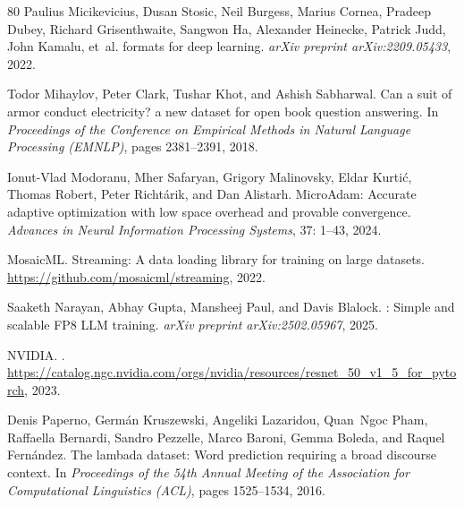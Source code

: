 \documentclass[10pt,twocolumn,letterpaper]{article}
\theoremstyle{plain}
\theoremstyle{definition}
\theoremstyle{remark}
\begin{document}
{\begin{thebibliography}{80}
Paulius Micikevicius, Dusan Stosic, Neil Burgess, Marius Cornea, Pradeep Dubey,
  Richard Grisenthwaite, Sangwon Ha, Alexander Heinecke, Patrick Judd, John
  Kamalu, et~al.
 formats for deep learning.
\newblock \emph{arXiv preprint arXiv:2209.05433}, 2022.

Todor Mihaylov, Peter Clark, Tushar Khot, and Ashish Sabharwal.
\newblock Can a suit of armor conduct electricity? a new dataset for open book
  question answering.
\newblock In \emph{Proceedings of the Conference on Empirical Methods in
  Natural Language Processing (EMNLP)}, pages 2381--2391, 2018.

Ionut-Vlad Modoranu, Mher Safaryan, Grigory Malinovsky, Eldar Kurti{\'c},
  Thomas Robert, Peter Richt{\'a}rik, and Dan Alistarh.
\newblock Micro{A}dam: Accurate adaptive optimization with low space overhead
  and provable convergence.
\newblock \emph{Advances in Neural Information Processing Systems},
  37: 1--43, 2024.

{MosaicML}.
\newblock Streaming: A data loading library for training on large datasets.
\newblock \url{https://github.com/mosaicml/streaming}, 2022.

Saaketh Narayan, Abhay Gupta, Mansheej Paul, and Davis Blalock.
: Simple and scalable {FP8} {LLM} training.
\newblock \emph{arXiv preprint arXiv:2502.05967}, 2025.

{NVIDIA}.
.
\newblock
  \url{https://catalog.ngc.nvidia.com/orgs/nvidia/resources/resnet_50_v1_5_for_pytorch},
  2023.

Denis Paperno, Germ{\'a}n Kruszewski, Angeliki Lazaridou, Quan~Ngoc Pham,
  Raffaella Bernardi, Sandro Pezzelle, Marco Baroni, Gemma Boleda, and Raquel
  Fern{\'a}ndez.
\newblock The lambada dataset: Word prediction requiring a broad discourse
  context.
\newblock In \emph{Proceedings of the 54th Annual Meeting of the Association
  for Computational Linguistics (ACL)}, pages 1525--1534, 2016.


\end{thebibliography}}
\end{document}
